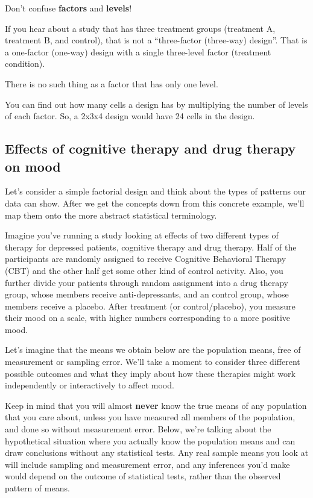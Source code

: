 \documentclass[]{book}
\begin{document}
Don't confuse \textbf{factors} and \textbf{levels}!

If you hear about a study that has three treatment groups (treatment A, treatment B, and control), that is not a ``three-factor (three-way) design''. That is a one-factor (one-way) design with a single three-level factor (treatment condition).

There is no such thing as a factor that has only one level.

You can find out how many cells a design has by multiplying the number of levels of each factor. So, a 2x3x4 design would have 24 cells in the design.

\hypertarget{effects-of-cognitive-therapy-and-drug-therapy-on-mood}{%
\subsection{Effects of cognitive therapy and drug therapy on mood}\label{effects-of-cognitive-therapy-and-drug-therapy-on-mood}}

Let's consider a simple factorial design and think about the types of patterns our data can show. After we get the concepts down from this concrete example, we'll map them onto the more abstract statistical terminology.

Imagine you've running a study looking at effects of two different types of therapy for depressed patients, cognitive therapy and drug therapy. Half of the participants are randomly assigned to receive Cognitive Behavioral Therapy (CBT) and the other half get some other kind of control activity. Also, you further divide your patients through random assignment into a drug therapy group, whose members receive anti-depressants, and an control group, whose members receive a placebo. After treatment (or control/placebo), you measure their mood on a scale, with higher numbers corresponding to a more positive mood.

Let's imagine that the means we obtain below are the population means, free of measurement or sampling error. We'll take a moment to consider three different possible outcomes and what they imply about how these therapies might work independently or interactively to affect mood.

Keep in mind that you will almost \textbf{never} know the true means of any population that you care about, unless you have measured all members of the population, and done so without measurement error. Below, we're talking about the hypothetical situation where you actually know the population means and can draw conclusions without any statistical tests. Any real sample means you look at will include sampling and measurement error, and any inferences you'd make would depend on the outcome of statistical tests, rather than the observed pattern of means.
\end{document}
